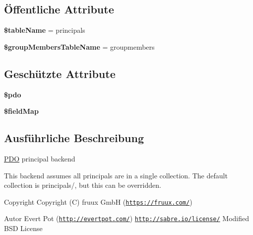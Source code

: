 \subsection*{Öffentliche Attribute}
\begin{DoxyCompactItemize}
\item 
\mbox{\label{class_sabre_1_1_d_a_v_a_c_l_1_1_principal_backend_1_1_p_d_o_ad389afa042763043b1b557471a407af6}} 
{\bfseries \$table\+Name} = \textquotesingle{}principals\textquotesingle{}
\item 
\mbox{\label{class_sabre_1_1_d_a_v_a_c_l_1_1_principal_backend_1_1_p_d_o_a8d49c882259430b854c56b27ff09d0e7}} 
{\bfseries \$group\+Members\+Table\+Name} = \textquotesingle{}groupmembers\textquotesingle{}
\end{DoxyCompactItemize}
\subsection*{Geschützte Attribute}
\begin{DoxyCompactItemize}
\item 
\mbox{\label{class_sabre_1_1_d_a_v_a_c_l_1_1_principal_backend_1_1_p_d_o_af2c2d583cccc368f65c4aa8dfe9bcccf}} 
{\bfseries \$pdo}
\item 
{\bfseries \$field\+Map}
\end{DoxyCompactItemize}


\subsection{Ausführliche Beschreibung}
\mbox{\hyperlink{class_sabre_1_1_d_a_v_a_c_l_1_1_principal_backend_1_1_p_d_o}{P\+DO}} principal backend

This backend assumes all principals are in a single collection. The default collection is \textquotesingle{}principals/\textquotesingle{}, but this can be overridden.

\begin{DoxyCopyright}{Copyright}
Copyright (C) fruux GmbH (\href{https://fruux.com/}{\tt https\+://fruux.\+com/}) 
\end{DoxyCopyright}
\begin{DoxyAuthor}{Autor}
Evert Pot (\href{http://evertpot.com/}{\tt http\+://evertpot.\+com/})  \href{http://sabre.io/license/}{\tt http\+://sabre.\+io/license/} Modified B\+SD License 
\end{DoxyAuthor}


